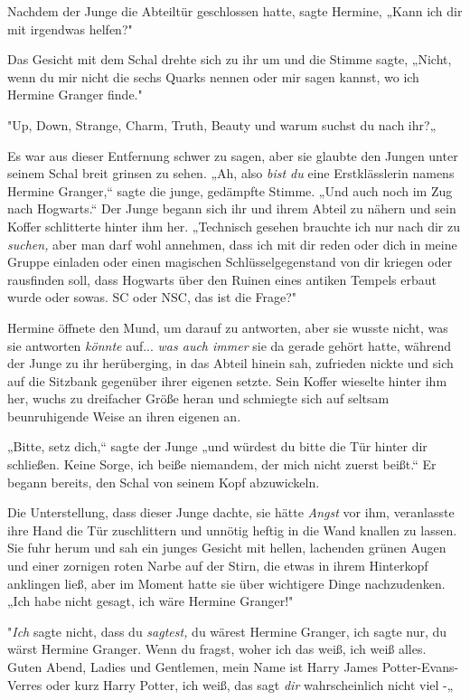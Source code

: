 {Nachdem der Junge die Abteiltür geschlossen hatte, sagte Hermine, „Kann ich dir mit irgendwas helfen?"

Das Gesicht mit dem Schal drehte sich zu ihr um und die Stimme sagte, „Nicht, wenn du mir nicht die sechs Quarks nennen oder mir sagen kannst, wo ich Hermine Granger finde."

"Up, Down, Strange, Charm, Truth, Beauty und warum suchst du nach ihr?„

Es war aus dieser Entfernung schwer zu sagen, aber sie glaubte den Jungen unter seinem Schal breit grinsen zu sehen. „Ah, also \emph{bist du} eine Erstklässlerin namens Hermine Granger,“ sagte die junge, gedämpfte Stimme. „Und auch noch im Zug nach Hogwarts.“ Der Junge begann sich ihr und ihrem Abteil zu nähern und sein Koffer schlitterte hinter ihm her. „Technisch gesehen brauchte ich nur nach dir zu \emph{suchen,} aber man darf wohl annehmen, dass ich mit dir reden oder dich in meine Gruppe einladen oder einen magischen Schlüsselgegenstand von dir kriegen oder rausfinden soll, dass Hogwarts über den Ruinen eines antiken Tempels erbaut wurde oder sowas. SC oder NSC, das ist die Frage?"

Hermine öffnete den Mund, um darauf zu antworten, aber sie wusste nicht, was sie antworten \emph{könnte} auf... \emph{was auch immer} sie da gerade gehört hatte, während der Junge zu ihr herüberging, in das Abteil hinein sah, zufrieden nickte und sich auf die Sitzbank gegenüber ihrer eigenen setzte. Sein Koffer wieselte hinter ihm her, wuchs zu dreifacher Größe heran und schmiegte sich auf seltsam beunruhigende Weise an ihren eigenen an.

„Bitte, setz dich,“ sagte der Junge „und würdest du bitte die Tür hinter dir schließen. Keine Sorge, ich beiße niemandem, der mich nicht zuerst beißt.“ Er begann bereits, den Schal von seinem Kopf abzuwickeln.

Die Unterstellung, dass dieser Junge dachte, sie hätte \emph{Angst} vor ihm, veranlasste ihre Hand die Tür zuschlittern und unnötig heftig in die Wand knallen zu lassen. Sie fuhr herum und sah ein junges Gesicht mit hellen, lachenden grünen Augen und einer zornigen roten Narbe auf der Stirn, die etwas in ihrem Hinterkopf anklingen ließ, aber im Moment hatte sie über wichtigere Dinge nachzudenken. „Ich habe nicht gesagt, ich wäre Hermine Granger!"

"\emph{Ich} sagte nicht, dass du \emph{sagtest,} du wärest Hermine Granger, ich sagte nur, du wärst Hermine Granger. Wenn du fragst, woher ich das weiß, ich weiß alles. Guten Abend, Ladies und Gentlemen, mein Name ist Harry James Potter-Evans-Verres oder kurz Harry Potter, ich weiß, das sagt \emph{dir} wahrscheinlich nicht viel -„

}
